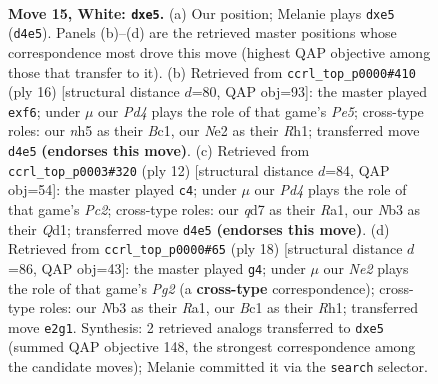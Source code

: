 \documentclass[11pt]{article}
\begin{document}
\clearpage

\begin{figure}[p]\centering
\begin{subfigure}{0.46\textwidth}\centering
\resizebox{\linewidth}{!}{%
\newchessgame
\chessboard[
  setfen={r1b2kr1/1p1qbp1p/p1n3p1/2Ppp2n/3P4/1N6/PP1KNPPP/1RBQ1B1R w - - 0 15},
  showmover=false,
  pgfstyle=straightmove, color=movearrow, markmove={d4-e5}
]}
\caption{}
\end{subfigure}\hfill
\begin{subfigure}{0.46\textwidth}\centering
\resizebox{\linewidth}{!}{%
\newchessgame
\chessboard[
  setfen={r1bqkb1r/pp1n2pp/2n1pp2/3pP3/3P4/5N2/PP2NPPP/R1BQKB1R w KQkq - 0 9},
  showmover=false,
  pgfstyle=straightmove, color=movearrow, markmove={e5-f6}
]}
\caption{}
\end{subfigure}
\\[4pt]
\begin{subfigure}{0.46\textwidth}\centering
\resizebox{\linewidth}{!}{%
\newchessgame
\chessboard[
  setfen={r2qkbnr/pp1n1ppp/4p3/2ppPb2/3P4/5N2/PPPNBPPP/R1BQK2R w KQkq - 0 7},
  showmover=false,
  pgfstyle=straightmove, color=movearrow, markmove={c2-c4}
]}
\caption{}
\end{subfigure}\hfill
\begin{subfigure}{0.46\textwidth}\centering
\resizebox{\linewidth}{!}{%
\newchessgame
\chessboard[
  setfen={r3kb1r/1pqb1ppp/p1nppn2/8/3NPP2/2N1B3/PPPQB1PP/R3K2R w KQkq - 4 10},
  showmover=false,
  pgfstyle=straightmove, color=movearrow, markmove={g2-g4}
]}
\caption{}
\end{subfigure}
\caption{\textbf{Move 15, White: \texttt{dxe5}.} (a) Our position; Melanie plays \texttt{dxe5} (\texttt{d4e5}). Panels (b)--(d) are the retrieved master positions whose correspondence most drove this move (highest QAP objective among those that transfer to it). (b) Retrieved from \texttt{ccrl\_top\_p0000\#410} (ply 16) [structural distance $d$=80, QAP obj=93]: the master played \texttt{exf6}; under $\mu$ our \emph{Pd4} plays the role of that game's \emph{Pe5}; cross-type roles: our \emph{n}h5 as their \emph{B}c1, our \emph{N}e2 as their \emph{R}h1; transferred move \texttt{d4e5} \textbf{(endorses this move)}. (c) Retrieved from \texttt{ccrl\_top\_p0003\#320} (ply 12) [structural distance $d$=84, QAP obj=54]: the master played \texttt{c4}; under $\mu$ our \emph{Pd4} plays the role of that game's \emph{Pc2}; cross-type roles: our \emph{q}d7 as their \emph{R}a1, our \emph{N}b3 as their \emph{Q}d1; transferred move \texttt{d4e5} \textbf{(endorses this move)}. (d) Retrieved from \texttt{ccrl\_top\_p0000\#65} (ply 18) [structural distance $d$=86, QAP obj=43]: the master played \texttt{g4}; under $\mu$ our \emph{Ne2} plays the role of that game's \emph{Pg2} (a \textbf{cross-type} correspondence); cross-type roles: our \emph{N}b3 as their \emph{R}a1, our \emph{B}c1 as their \emph{R}h1; transferred move \texttt{e2g1}. Synthesis: 2 retrieved analogs transferred to \texttt{dxe5} (summed QAP objective 148, the strongest correspondence among the candidate moves); Melanie committed it via the \texttt{search} selector.}
\label{fig:thought-m28}
\end{figure}
\end{document}
